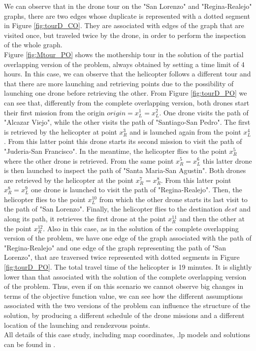 \documentclass[10pt,a4paper]{elsarticle}
\newcommand{\EN}[1]{{\color{black}#1}}
\begin{document}
We can observe that in the drone tour on \EN{the} "San Lorenzo" and "Regina-Realejo" graphs, there are two edges whose duplicate is represented with a dotted segment in Figure \ref{fig:tourD_CO}. They are associated with edges of the graph that are visited once, but traveled twice by the drone, in order to perform the inspection of the whole graph.\\
Figure \ref{fig:Mtour_PO} shows the mothership tour in the solution of the partial overlapping version of the problem, always obtained by setting a time limit of 4 hours. In this case, we can observe that the helicopter follows a different tour and that there are more launching and retrieving points due to the possibility of launching \EN{one} drone before retrieving the other. From Figure \ref{fig:tourD_PO} we can see that, differently from the complete overlapping version, both drones start their first mission from the origin $origin=x_L^1=x_L^2$. One drone visits the path of "Alcazar Viejo", while the other visits the path of "Santiago-San Pedro". The first is retrieved by the helicopter at point $x_R^3$ and is launched again from the point $x_L^4$. From this latter point this drone starts its second mission to visit the path of "Juderia-San Francisco". In the meantime, the helicopter flies to the point $x_R^5$ where the other drone is retrieved. From the same point $x_R^5=x_L^6$ this latter drone is then launched to inspect the path of "Santa Maria-San Agustin". Both drones are retrieved by the helicopter at the point $x_R^7=x_R^8$. From this latter point $x_R^8=x_L^9$ one drone is launched to visit the path of "Regina-Realejo". Then, the helicopter flies to the point $x_L^{10}$ from \EN{which} the other drone starts its last visit to the path of "San Lorenzo". Finally, the helicopter flies to the destination $dest$ and along its path, it retrieves the first drone at the point $x_R^{11}$ and then the other at the point $x_R^{12}$. Also in this case, \EN{as} in the solution of the complete overlapping version of the problem, we have one edge of the graph associated with the path of "Regina-Realejo" and one edge of the graph representing the path of "San Lorenzo", that are traversed twice represented with dotted segments in Figure \ref{fig:tourD_PO}. The total travel time of the helicopter is 19 minutes. It is slightly lower than \EN{that} associated with the solution of the complete overlapping version of the problem. Thus, even if on this scenario we cannot observe big changes in terms of the objective function value, we can see how the different assumptions associated with the two versions of the problem can influence the structure of the solution, by producing a different schedule of the drone missions and a different location of the launching and rendezvous points.\\
\noindent
All details of this case study, including map coordinates, .lp models and solutions can be found in \cite{Puerto2021}.
\end{document}
